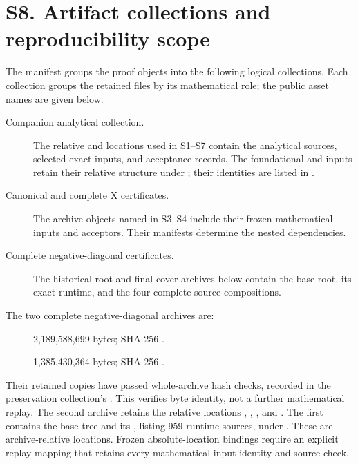 \documentclass[10pt]{article}
\begin{document}
\section*{S8. Artifact collections and reproducibility scope}

The manifest groups the proof objects into the following logical
collections. Each collection groups the retained files by its
mathematical role; the public asset names are given below.
\begin{description}
\item[Companion analytical collection.]
The relative  and  locations used in
S1--S7 contain the analytical sources, selected exact inputs, and
acceptance records. The foundational  and 
inputs retain their relative structure under
; their identities are listed in
.
\item[Canonical and complete X certificates.]
The archive objects named in S3--S4 include their frozen mathematical
inputs and acceptors. Their manifests determine the nested dependencies.
\item[Complete negative-diagonal certificates.]
The historical-root and final-cover archives below contain the base
root, its exact runtime, and the four complete source compositions.
\end{description}

The two complete negative-diagonal archives are:
\begin{description}
\item[]
2,189,588,699 bytes; SHA-256
.
\item[]
1,385,430,364 bytes; SHA-256
.
\end{description}
Their retained copies have passed whole-archive hash checks, recorded
in the preservation collection's .
This verifies byte identity, not a further mathematical replay.
The second archive retains the relative locations
,
,
, and
.
The first contains the base tree and its
, listing 959 runtime sources,
under .
These are archive-relative locations. Frozen absolute-location bindings
require an explicit replay mapping that retains every mathematical
input identity and source check.
\end{document}
